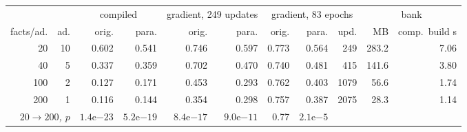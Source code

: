 \setlength{\tabcolsep}{4pt}
\begin{tabular}{rrrrrrrrrrr}
\toprule
& & \multicolumn{2}{c}{compiled} & \multicolumn{2}{c}{gradient, 249 updates} & \multicolumn{3}{c}{gradient, 83 epochs} & \multicolumn{2}{c}{bank} \\
\cmidrule(lr){3-4}\cmidrule(lr){5-6}\cmidrule(lr){7-9}\cmidrule(lr){10-11}
facts/ad. & ad. & orig. & para. & orig. & para. & orig. & para. & upd. & MB & comp.\ build s \\
\midrule
20 & 10 & 0.602 & 0.541 & 0.746 & 0.597 & 0.773 & 0.564 & 249 & 283.2 & 7.06 \\
40 & 5 & 0.337 & 0.359 & 0.702 & 0.470 & 0.740 & 0.481 & 415 & 141.6 & 3.80 \\
100 & 2 & 0.127 & 0.171 & 0.453 & 0.293 & 0.762 & 0.403 & 1079 & 56.6 & 1.74 \\
200 & 1 & 0.116 & 0.144 & 0.354 & 0.298 & 0.757 & 0.387 & 2075 & 28.3 & 1.14 \\
\midrule
\multicolumn{2}{r}{\itshape $20\to200$, $p$} & $1.4\mathrm{e}{-23}$ & $5.2\mathrm{e}{-19}$ & $8.4\mathrm{e}{-17}$ & $9.0\mathrm{e}{-11}$ & 0.77 & $2.1\mathrm{e}{-5}$ & & & \\
\bottomrule
\end{tabular}
